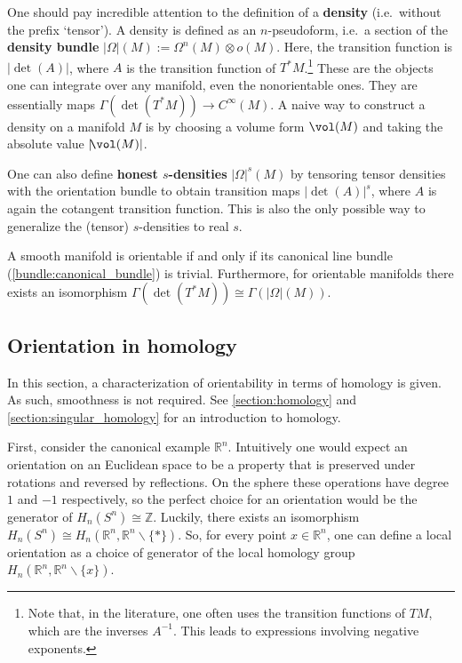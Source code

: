     \begin{remark}\label{bundle:honest_density}
        One should pay incredible attention to the definition of a \textbf{density} (i.e.~without the prefix `tensor'). A density is defined as an $n$-pseudoform, i.e.~a section of the \textbf{density bundle} $|\Omega|(M):=\Omega^n(M)\otimes o(M)$. Here, the transition function is $|\!\det(A)|$, where $A$ is the transition function of $T^*M$.\footnote{Note that, in the literature, one often uses the transition functions of $TM$, which are the inverses $A^{-1}$. This leads to expressions involving negative exponents.} These are the objects one can integrate over any manifold, even the nonorientable ones. They are essentially maps $\Gamma(\det(T^*M))\rightarrow C^\infty(M)$. A naive way to construct a density on a manifold $M$ is by choosing a volume form $\vol(M)$ and taking the absolute value $|\!\vol(M)|$.

        One can also define \textbf{honest $s$-densities} $|\Omega|^s(M)$ by tensoring tensor densities with the orientation bundle to obtain transition maps $|\!\det(A)|^s$, where $A$ is again the cotangent transition function. This is also the only possible way to generalize the (tensor) $s$-densities to real $s$.
    \end{remark}

    \begin{property}[Orientability]
        A smooth manifold is orientable if and only if its canonical line bundle (\cref{bundle:canonical_bundle}) is trivial. Furthermore, for orientable manifolds there exists an isomorphism $\Gamma(\det(T^*M))\cong\Gamma(|\Omega|(M))$.
    \end{property}

\subsection{Orientation in homology}

    In this section, a characterization of orientability in terms of homology is given. As such, smoothness is not required. See \cref{section:homology} and \cref{section:singular_homology} for an introduction to homology.

    First, consider the canonical example $\mathbb{R}^n$. Intuitively one would expect an orientation on an Euclidean space to be a property that is preserved under rotations and reversed by reflections. On the sphere these operations have degree $1$ and $-1$ respectively, so the perfect choice for an orientation would be the generator of $H_n(S^n)\cong\mathbb{Z}$. Luckily, there exists an isomorphism $H_n(S^n)\cong H_n(\mathbb{R}^n,\mathbb{R}^n\backslash\{\ast\})$. So, for every point $x\in\mathbb{R}^n$, one can define a local orientation as a choice of generator of the local homology group $H_n(\mathbb{R}^n,\mathbb{R}^n\backslash\{x\})$.

